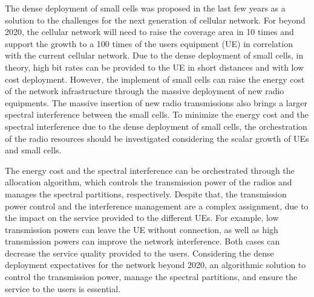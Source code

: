 The dense deployment of small cells was proposed in the last few years as a solution to the challenges for the next generation of cellular network. For beyond 2020, the cellular network will need to raise the coverage area in 10 times and support the growth to a 100 times of the users equipment (UE) in correlation with the current cellular network.
Due to the dense deployment of small cells, in theory, high bit rates can be provided to the UE in short distances and with low cost deployment.
However, the implement of small cells can raise the energy cost of the network infrastructure through the massive deployment of new radio equipments. The massive insertion of new radio transmissions also brings a larger spectral interference between the small cells.
To minimize the energy cost and the spectral interference due to the dense deployment of small cells, the orchestration of the radio resources should be investigated considering the scalar growth of UEs and small cells. 

The energy cost and the spectral interference can be orchestrated through the allocation algorithm, which controls the transmission power of the radios and manages the spectral partitions, respectively.
Despite that, the transmission power control and the interference management are a complex assignment, due to the impact on the service provided to the different UEs.
For example, low transmission powers can leave the UE without connection, as well as high transmission powers can improve the network interference. Both cases can decrease the service quality provided to the users.
Considering the dense deployment expectatives for the network beyond 2020, an algorithmic solution to control the transmission power, manage the spectral partitions, and ensure the service to the users is essential. 



